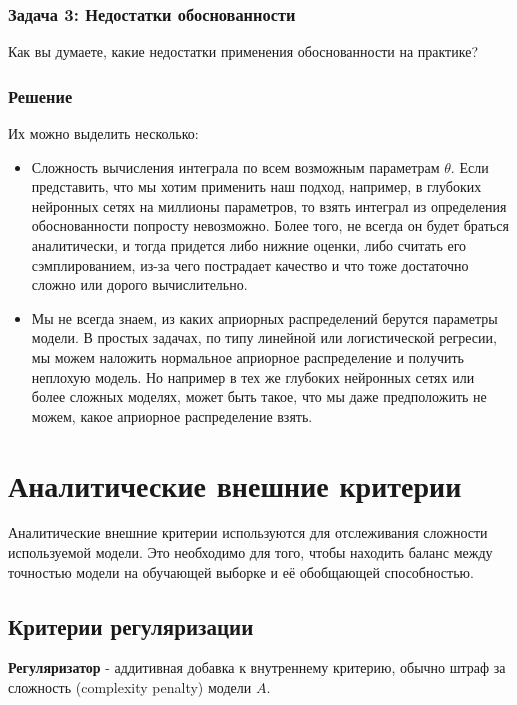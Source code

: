 \subsubsection{Задача 3: Недостатки обоснованности}
Как вы думаете, какие недостатки применения обоснованности на практике?
\subsubsection{Решение}

Их можно выделить несколько:
\begin{itemize}
 \item Сложность вычисления интеграла по всем возможным параметрам $\theta$. Если представить, что мы хотим применить наш подход, например, в глубоких нейронных сетях на миллионы параметров, то взять интеграл из определения обоснованности попросту невозможно. Более того, не всегда он будет браться аналитически, и тогда придется либо нижние оценки, либо считать его сэмплированием, из-за чего пострадает качество и что тоже достаточно сложно или дорого вычислительно.
 \item Мы не всегда знаем, из каких априорных распределений берутся параметры модели. В простых задачах, по типу линейной или логистической регресии, мы можем наложить нормальное априорное распределение и получить неплохую модель. Но например в тех же глубоких нейронных сетях или более сложных моделях, может быть такое, что мы даже предположить не можем, какое априорное распределение взять.
\end{itemize}


\section*{Аналитические внешние критерии}

\par Аналитические внешние критерии используются для отслеживания сложности используемой модели. Это необходимо для того, чтобы находить баланс между точностью модели на обучающей выборке и её обобщающей способностью.

\subsection*{Критерии регуляризации}

\par \textbf{Регуляризатор} - аддитивная добавка к внутреннему критерию, обычно штраф за сложность (complexity penalty) модели $A$. 

